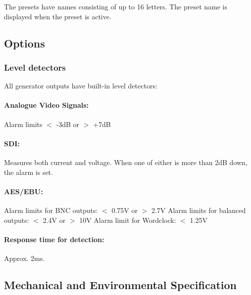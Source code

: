 The presets have names consisting of up to 16 letters. The preset name is displayed when the preset is active.

\clearpage
\subsection{Options}

\clearpage

\clearpage

\clearpage

\clearpage

\clearpage

\clearpage

\clearpage

\clearpage

\clearpage

\clearpage

\clearpage

\clearpage

\clearpage

\clearpage

\clearpage

\subsubsection{Level detectors}
All generator outputs have built-in level detectors:

\paragraph{Analogue Video Signals:}
Alarm limits $<$ -3dB or $>$ +7dB

\paragraph{SDI:}
Measures both current and voltage. When one of either is more than 2dB down, the alarm is set.

\paragraph{AES/EBU:}
Alarm limits for BNC outputs: $<$ 0.75V or $>$ 2.7V
Alarm limits for balanced outputs: $<$ 2.4V or $>$ 10V
Alarm limit for Wordclock: $<$ 1.25V

\paragraph{Response time for detection:}
Approx. 2ms.

\subsection{Mechanical and Environmental Specification}
